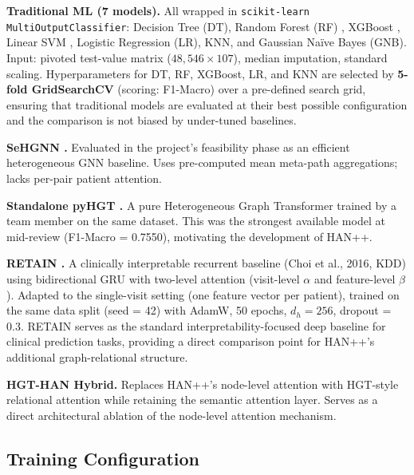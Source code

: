 \documentclass[conference]{IEEEtran}
\begin{document}
\textbf{Traditional ML (7 models).}
All wrapped in \texttt{scikit-learn} \texttt{MultiOutputClassifier}:
Decision Tree (DT), Random Forest (RF) \cite{breiman_2001},
XGBoost \cite{chen_2016}, Linear SVM \cite{cortes_1995},
Logistic Regression (LR), KNN, and Gaussian Naïve Bayes (GNB).
Input: pivoted test-value matrix ($48{,}546 \times 107$), median imputation,
standard scaling.
Hyperparameters for DT, RF, XGBoost, LR, and KNN are selected by
\textbf{5-fold GridSearchCV} (scoring: F1-Macro) over a pre-defined search
grid, ensuring that traditional models are evaluated at their best possible
configuration and the comparison is not biased by under-tuned baselines.

\textbf{SeHGNN \cite{yang_2023}.}
Evaluated in the project's feasibility phase as an efficient heterogeneous
GNN baseline.
Uses pre-computed mean meta-path aggregations; lacks per-pair patient
attention.

\textbf{Standalone pyHGT \cite{hu_2020}.}
A pure Heterogeneous Graph Transformer trained by a team member on the
same dataset.
This was the strongest available model at mid-review (F1-Macro = 0.7550),
motivating the development of HAN++.

\textbf{RETAIN \cite{choi_2016_retain}.}
A clinically interpretable recurrent baseline (Choi et al., 2016, KDD)
using bidirectional GRU with two-level attention (visit-level $\alpha$
and feature-level $\beta$).
Adapted to the single-visit setting (one feature vector per patient),
trained on the same data split (seed = 42) with AdamW, 50 epochs,
$d_h = 256$, dropout = 0.3.
RETAIN serves as the standard interpretability-focused deep baseline
for clinical prediction tasks, providing a direct comparison point
for HAN++'s additional graph-relational structure.

\textbf{HGT-HAN Hybrid.}
Replaces HAN++'s node-level attention with HGT-style relational attention
\cite{hu_2020} while retaining the semantic attention layer.
Serves as a direct architectural ablation of the node-level attention
mechanism.

\subsection{Training Configuration}
\label{subsec:training}
\end{document}
